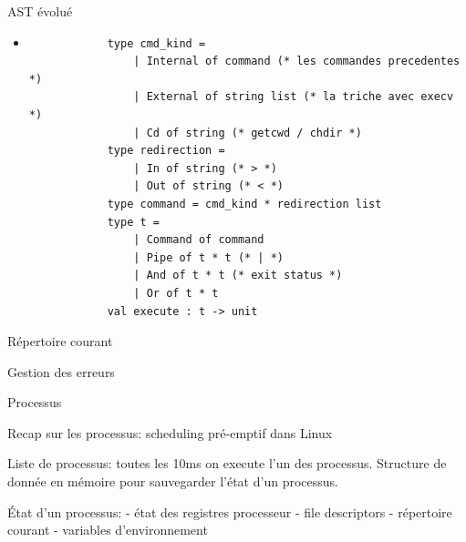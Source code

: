 \begin{frame}[fragile]{AST évolué}
    \begin{itemize}[leftmargin=-10pt] 
         \item
        \begin{lstlisting}
            type cmd_kind =
                | Internal of command (* les commandes precedentes *)
                | External of string list (* la triche avec execv *)
                | Cd of string (* getcwd / chdir *)
            type redirection =
                | In of string (* > *)
                | Out of string (* < *)
            type command = cmd_kind * redirection list
            type t = 
                | Command of command
                | Pipe of t * t (* | *)
                | And of t * t (* exit status *)
                | Or of t * t
            val execute : t -> unit
        \end{lstlisting}
    \end{itemize}

\end{frame}

\begin{frame}{Répertoire courant}

\end{frame}


\begin{frame}{Gestion des erreurs}

\end{frame}

\begin{frame}{Processus}

Recap sur les processus: scheduling pré-emptif dans Linux

Liste de processus: toutes les 10ms on execute l'un des processus.
Structure de donnée en mémoire pour sauvegarder l'état d'un processus.

État d'un processus: 
- état des registres processeur
- file descriptors
- répertoire courant
- variables d'environnement

\end{frame}
